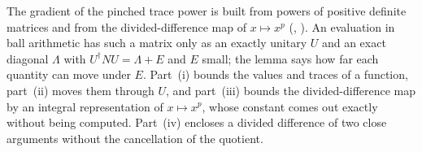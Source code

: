 
The gradient of the pinched trace power is built from powers of positive
definite matrices and from the divided-difference map of $x\mapsto x^{p}$
(, ). An evaluation in
ball arithmetic has such a matrix only as an exactly unitary $U$ and an exact
diagonal $\Lambda$ with $U^{\dagger}NU=\Lambda+E$ and $E$ small; the lemma
says how far each quantity can move under $E$. Part~(i) bounds the values
and traces of a function, part~(ii) moves them through $U$, and part~(iii)
bounds the divided-difference map by an integral representation of
$x\mapsto x^{p}$, whose constant comes out exactly without being computed.
Part~(iv) encloses a divided difference of two close arguments without the
cancellation of the quotient.

